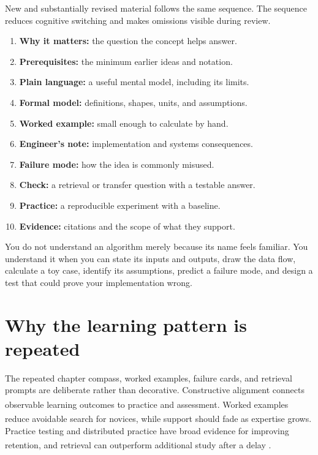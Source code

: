 New and substantially revised material follows the same sequence.
The sequence reduces cognitive switching and makes omissions visible during
review.

\begin{enumerate}
    \item \textbf{Why it matters:} the question the concept helps answer.
    \item \textbf{Prerequisites:} the minimum earlier ideas and notation.
    \item \textbf{Plain language:} a useful mental model, including its limits.
    \item \textbf{Formal model:} definitions, shapes, units, and assumptions.
    \item \textbf{Worked example:} small enough to calculate by hand.
    \item \textbf{Engineer's note:} implementation and systems consequences.
    \item \textbf{Failure mode:} how the idea is commonly misused.
    \item \textbf{Check:} a retrieval or transfer question with a testable
          answer.
    \item \textbf{Practice:} a reproducible experiment with a baseline.
    \item \textbf{Evidence:} citations and the scope of what they support.
\end{enumerate}

\begin{engineernote}
You do not understand an algorithm merely because its name feels familiar.
You understand it when you can state its inputs and outputs, draw the data
flow, calculate a toy case, identify its assumptions, predict a failure mode,
and design a test that could prove your implementation wrong.
\end{engineernote}

\section*{Why the learning pattern is repeated}

The repeated chapter compass, worked examples, failure cards, and retrieval
prompts are deliberate rather than decorative.
Constructive alignment connects observable learning outcomes to practice and
assessment\textsuperscript{\cite{biggsEnhancingTeachingConstructive1996}}.
Worked examples reduce avoidable search for novices, while support should fade
as expertise grows\textsuperscript{\cite{swellerCognitiveLoadTheory2019}}.
Practice testing and distributed practice have broad evidence for improving
retention\textsuperscript{\cite{dunloskyImprovingStudentsLearning2013}}, and
retrieval can outperform additional study after a delay
\textsuperscript{\cite{roedigerTestEnhancedLearning2006}}.

